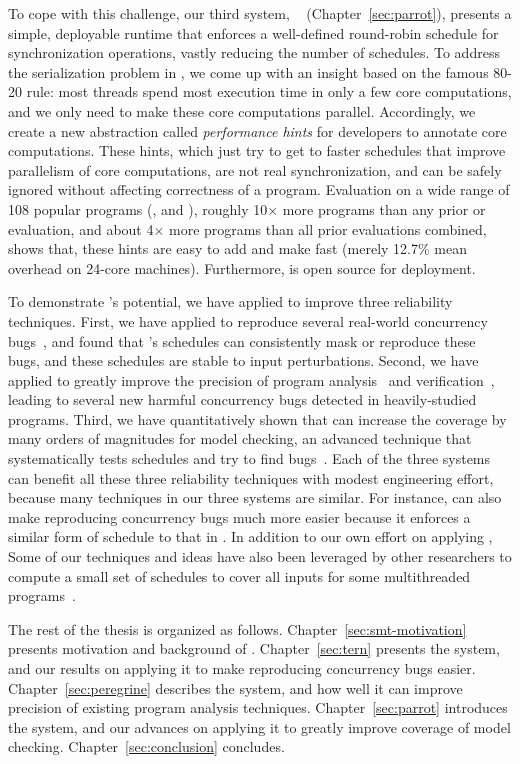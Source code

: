 To cope with this challenge, our third \smt system, \parrot~\cite{parrot:sosp13}
(Chapter~\ref{sec:parrot}), presents a simple, deployable runtime that enforces
a
well-defined round-robin schedule for synchronization operations, vastly
reducing the number of schedules. To address the serialization problem in \smt,
we come up with an insight based on the famous 80-20 rule: most threads spend
most execution time in only a few core computations, and we only need to make 
these core computations parallel. Accordingly, we create a new abstraction
called \emph{performance hints} for developers to annotate core computations.
These hints, which just try to get to faster schedules that improve parallelism
of core computations, are not real synchronization, and can be safely ignored
without affecting correctness of a program. Evaluation on a wide range of 108
popular programs (\eg, \bdb and \mplayer), roughly 10$\times$ more programs than
any prior \smt or \dmt evaluation, and about 4$\times$ more programs than all
prior evaluations combined, shows that, these hints are easy to add and make
\parrot fast (merely 12.7\% mean overhead on 24-core machines). Furthermore,
\parrot is open source for deployment.

To demonstrate \smt's potential, we have applied \smt to improve three
reliability techniques. First, we have applied \tern to reproduce several
real-world concurrency bugs~\cite{cui:tern:osdi10}, and found that \smt's
schedules can consistently mask or reproduce these bugs, and these schedules are
stable to input perturbations. Second, we have applied \peregrine to greatly
improve the precision of program analysis~\cite{wu:pldi12} and
verification~\cite{wu:pldi12}, leading to several new harmful concurrency bugs
detected in heavily-studied programs. Third, we have quantitatively shown that
\parrot can increase the coverage by many orders of magnitudes for model
checking, an advanced technique that systematically tests schedules and try to
find bugs~\cite{parrot:sosp13, dbug:spin11, modist:nsdi09}. Each of the three
systems can benefit all these three reliability techniques with modest
engineering effort, because many techniques in our three \smt systems are
similar. For instance, \parrot can also make reproducing concurrency bugs much
more easier because it enforces a similar form of schedule to that in \tern. In
addition to our own effort on applying \smt, Some of our \smt techniques and
ideas have also been leveraged by other researchers to compute a small set of
schedules to cover all inputs for some multithreaded
programs~\cite{bergan:oopsla13}.

The rest of the thesis is organized as follows. Chapter~\ref{sec:smt-motivation}
presents motivation and background of \smt.  Chapter~\ref{sec:tern} presents
the \tern system, and our results on applying it to make reproducing concurrency
bugs easier. Chapter~\ref{sec:peregrine} describes the \peregrine system, and
how well it can improve precision of existing program analysis techniques.
Chapter~\ref{sec:parrot} introduces the \parrot system, and our advances on
applying it to greatly improve coverage of model checking.
Chapter~\ref{sec:conclusion} concludes.



